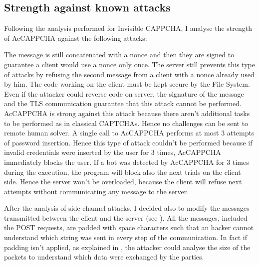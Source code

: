 \subsection{Strength against known attacks}\label{Results:attacks}
Following the analysis performed for Invisible CAPPCHA\cite{Invisible_CAPPCHA}, I analyse the strength of AcCAPPCHA against the following attacks:
\begin{itemize}
{The message is still concatenated with a nonce and then they are signed to guarantee a client would use a nonce only once. The server still prevents this type of attacks by refusing the second message from a client with a nonce already used by him.}
{The code working on the client must be kept secure by the File System. Even if the attacker could reverse code on server, the signature of the message and the TLS communication guarantee that this attack cannot be performed.}
{AcCAPPCHA is strong against this attack because there aren't additional tasks to be performed as in classical CAPTCHAs. Hence no challenges can be sent to remote human solver.}
{A single call to AcCAPPCHA performs at most 3 attempts of password insertion. Hence this type of attack couldn't be performed because if invalid credentials were inserted by the user for 3 times, AcCAPPCHA immediately blocks the user.
}
{If a bot was detected by AcCAPPCHA for 3 times during the execution, the program will block also the next trials on the client side. Hence the server won't be overloaded, because the client will refuse next attempts without communicating any message to the server.}
\end{itemize}
After the analysis of side-channel attacks, I decided also to modify the messages transmitted between the client and the server (see ). All the messages, included the POST requests, are padded with space characters such that an hacker cannot understand which string was sent in every step of the communication. In fact if padding isn't applied, as explained in , the attacker could analyse the size of the packets to understand which data were exchanged by the parties.

